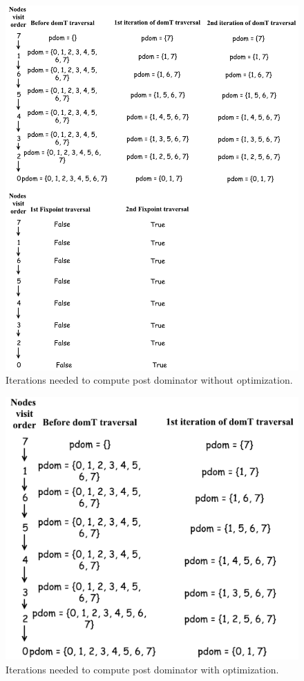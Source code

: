 \begin{figure}[ht!]
	\centering
	\includegraphics[width=1\linewidth]{tex-figures/optimization.pdf}
	\caption{Iterations needed to compute post dominator without optimization.}
	\label{fig:opt-example}
\end{figure}
\begin{figure}
	\centering
	\includegraphics[width=0.5\linewidth]{tex-figures/optimization2.pdf}
		\caption{Iterations needed to compute post dominator with optimization.}
	\label{fig:opt-example1}
\end{figure}
